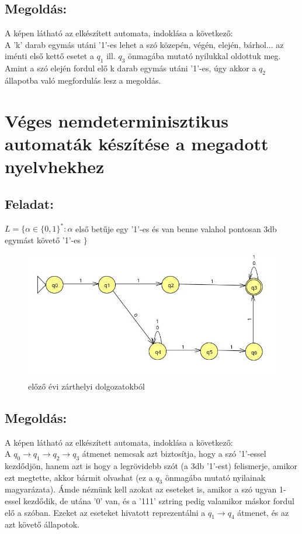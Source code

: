 \documentclass[12pt]{article}
\begin{document}
\subsection{Megoldás:}
A képen látható az elkészített automata, indoklása a következő: \\
A 'k' darab egymás utáni '1'-es lehet a szó közepén, végén, elején, bárhol... az iménti első kettő esetet a 
$q_1$ ill. $q_3$ önmagába mutató nyilukkal oldottuk meg. Amint a szó elején fordul elő k darab egymás utáni
'1'-es, úgy akkor a $q_2$ állapotba való megfordulás lesz a megoldás.

\section{Véges nemdeterminisztikus automaták készítése a megadott nyelvhekhez}
\subsection{Feladat:}
$ L=\{ \alpha \in \{0,1\}^* : \alpha $ első betűje egy '1'-es és van benne valahol pontosan 
3db egymást követő '1'-es $ \} $
\begin{figure}[h]
  \centering
  \includegraphics[width=0.7\linewidth]{img/nd_01.jpg} 
  \caption{előző évi zárthelyi dolgozatokból}
  \label{fig:your_label}
\end{figure}
\subsection{Megoldás:}
A képen látható az elkészített automata, indoklása a következő: \\
A $q_0 \rightarrow q_1 \rightarrow q_2 \rightarrow q_3$ átmenet nemcsak azt biztosítja, hogy a szó '1'-essel
kezdődjön, hanem azt is hogy a legrövidebb szót (a 3db '1'-est) felismerje, amikor ezt megtette, akkor bármit
olvashat (ez a $q_3$ önmagába mutató nyilainak magyarázata). Ámde néznünk kell azokat az eseteket is, amikor
a szó ugyan 1-essel kezdődik, de utána '0' van, és a '111' sztring pedig valamikor máskor fordul elő a szóban.
Ezeket az eseteket hivatott reprezentálni a $q_1 \rightarrow q_4$ átmenet, és az azt követő állapotok.
\end{document}
